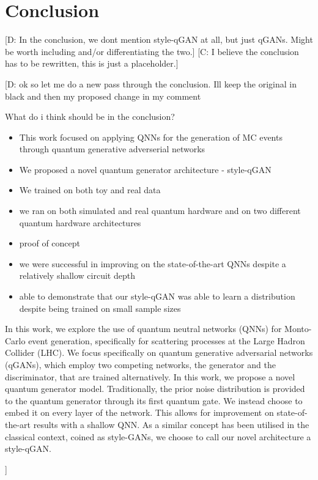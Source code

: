 \documentclass[twocolumn,preprintnumbers,superscriptaddress]{revtex4-2}
\newcommand{\commentCBP}[1]{{\color{red} {[C: #1]}}}
\newcommand{\commentDMG}[1]{{\color{orange} {[D: #1]}}}
\begin{document}
\section{Conclusion}
\label{sec:conclusion}
\commentDMG{In the conclusion, we dont mention style-qGAN at all, but just qGANs. Might be worth including and/or differentiating the two.}\commentCBP{I believe the conclusion has to be rewritten, this is just a placeholder.}
\commentDMG{ok so let me do a new pass through the conclusion. Ill keep the original in black and then my proposed change in my comment

What do i think should be in the conclusion?
\begin{itemize}
\item This work focused on applying QNNs for the generation of MC events through quantum generative adverserial networks
\item We proposed a novel quantum generator architecture - style-qGAN
\item We trained on both toy and real data
\item we ran on both simulated and real quantum hardware and on two different quantum hardware architectures
\item proof of concept
\item we were successful in improving on the state-of-the-art QNNs despite a relatively shallow circuit depth
\item able to demonstrate that our style-qGAN was able to learn a distribution despite being trained on small sample sizes
\end{itemize}

In this work, we explore the use of quantum neutral networks (QNNs) for Monto-Carlo event generation, specifically for scattering processes at the Large Hadron Collider (LHC). We focus specifically on quantum generative adversarial networks (qGANs), which employ two competing networks, the generator and the discriminator, that are trained alternatively. In this work, we propose a novel quantum generator model. Traditionally, the prior noise distribution is provided to the quantum generator through its first quantum gate. We instead choose to embed it on every layer of the network. This allows for improvement on state-of-the-art results with a shallow QNN.  As a similar concept has been utilised in the classical context, coined as style-GANs, we choose to call our novel architecture a style-qGAN.

}
\end{document}
